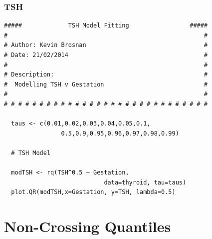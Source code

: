 \documentclass[12pt,a4paper]{report}
\begin{document}
\subsection*{TSH}\label{App:QuantileModelsTSH}
\begin{lstlisting}
#####             TSH Model Fitting                 #####
#                                                       #
# Author: Kevin Brosnan                                 #
# Date: 21/02/2014                                      #
#                                                       #
# Description:                                          #
#  Modelling TSH v Gestation                            #
#                                                       #
# # # # # # # # # # # # # # # # # # # # # # # # # # # # #

  taus <- c(0.01,0.02,0.03,0.04,0.05,0.1,
                0.5,0.9,0.95,0.96,0.97,0.98,0.99)

  # TSH Model

  modTSH <- rq(TSH^0.5 ~ Gestation,
                            data=thyroid, tau=taus)
  plot.QR(modTSH,x=Gestation, y=TSH, lambda=0.5)
\end{lstlisting}
\chapter{Non-Crossing Quantiles}
\end{document}
